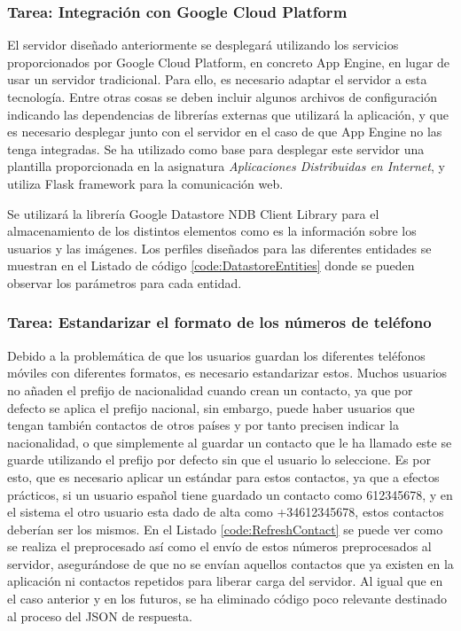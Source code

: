 \subsubsection{Tarea: Integración con Google Cloud Platform}

El servidor diseñado anteriormente se desplegará utilizando los servicios proporcionados por Google Cloud Platform, en concreto App Engine, en lugar de usar un servidor tradicional. Para ello, es necesario adaptar el servidor a esta tecnología. Entre otras cosas se deben incluir algunos archivos de configuración indicando las dependencias de librerías externas que utilizará la aplicación, y que es necesario desplegar junto con el servidor en el caso de que App Engine no las tenga integradas. Se ha utilizado como base para desplegar este servidor una plantilla proporcionada en la asignatura \textit{Aplicaciones Distribuidas en Internet}, y utiliza Flask framework para la comunicación web.

Se utilizará la librería Google Datastore NDB Client Library para el almacenamiento de los distintos elementos como es la información sobre los usuarios y las imágenes. Los perfiles diseñados para las diferentes entidades se muestran en el Listado de código \ref{code:DatastoreEntities} donde se pueden observar los parámetros para cada entidad.\\




\subsubsection{Tarea: Estandarizar el formato de los números de teléfono} 

Debido a la problemática de que los usuarios guardan los diferentes teléfonos móviles con diferentes formatos, es necesario estandarizar estos. Muchos usuarios no añaden el prefijo de nacionalidad cuando crean un contacto, ya que por defecto se aplica el prefijo nacional, sin embargo, puede haber usuarios que tengan también contactos de otros países y por tanto precisen indicar la nacionalidad, o que simplemente al guardar un contacto que le ha llamado este se guarde utilizando el prefijo por defecto sin que el usuario lo seleccione. Es por esto, que es necesario aplicar un estándar para estos contactos, ya que a efectos prácticos, si un usuario español tiene guardado un contacto como 612345678, y en el sistema el otro usuario esta dado de alta como +34612345678, estos contactos deberían ser los mismos. En el Listado \ref{code:RefreshContact} se puede ver como se realiza el preprocesado así como el envío de estos números preprocesados al servidor, asegurándose de que no se envían aquellos contactos que ya existen en la aplicación ni contactos repetidos para liberar carga del servidor. Al igual que en el caso anterior y en los futuros, se ha eliminado código poco relevante destinado al proceso del JSON de respuesta. \\

